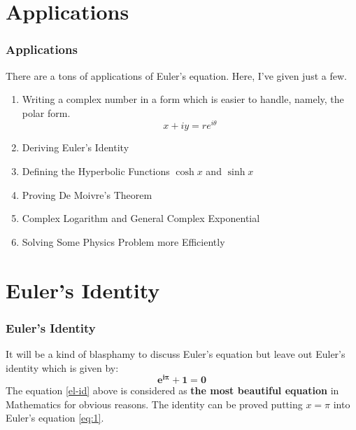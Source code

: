 \documentclass{beamer}
\begin{document}
\section{Applications}
\begin{frame}
    \frametitle{Applications}
     There are a tons of applications of Euler's equation. Here, I've given just a few.
    \begin{enumerate}
        \color{blue}
        \item <2-> Writing a complex number in a form which is easier to handle, namely, the polar form. $$x+iy = re^{i\theta}$$ 
        \item <3-> Deriving Euler's Identity 
        \item <4-> Defining the Hyperbolic Functions $\cosh{x}$ and $\sinh{x}$ 
        \item <5-> Proving De Moivre’s Theorem 
        \item <6-> Complex Logarithm and General Complex Exponential
        \item <7-> Solving Some Physics Problem more Efficiently
    \end{enumerate}
\end{frame}

\section{Euler's Identity}
\begin{frame}
    \frametitle{Euler's Identity}
    \color{ginger}
    It will be a kind of blasphamy to discuss Euler's equation but leave out Euler's identity which is given by:
    \begin{equation}
        \label{el-id}
       \mathbf{e^{i\pi} + 1 = 0}
    \end{equation}
The equation \ref{el-id} above is considered as \textbf{the most beautiful equation} in Mathematics for obvious reasons. The identity can be proved putting $x=\pi$ into Euler's equation \ref{eq:1}.
\end{frame}
\end{document}
